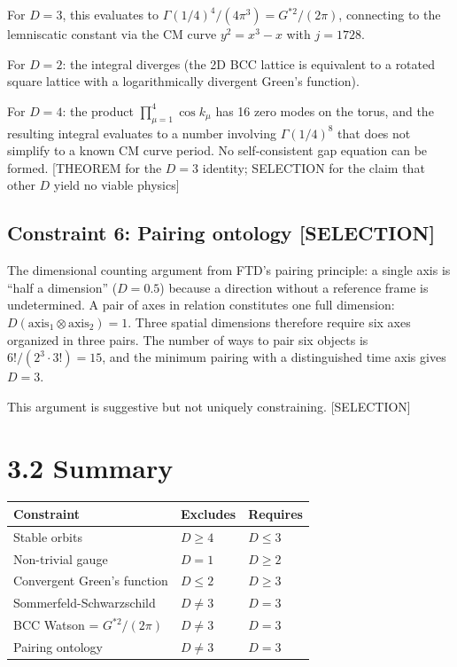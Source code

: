 \documentclass[
  11pt,
  letterpaper,
  twoside,
  openright]{book}
\begin{document}
For \(D = 3\), this evaluates to
\(\Gamma(1/4)^4 / (4\pi^3) = G^{*2}/(2\pi)\), connecting to the
lemniscatic constant via the CM curve \(y^2 = x^3 - x\) with
\(j = 1728\).

For \(D = 2\): the integral diverges (the 2D BCC lattice is equivalent
to a rotated square lattice with a logarithmically divergent Green's
function).

For \(D = 4\): the product \(\prod_{\mu=1}^4 \cos k_\mu\) has 16 zero
modes on the torus, and the resulting integral evaluates to a number
involving \(\Gamma(1/4)^8\) that does not simplify to a known CM curve
period. No self-consistent gap equation can be formed. {[}THEOREM for
the \(D = 3\) identity; SELECTION for the claim that other \(D\) yield
no viable physics{]}

\subsection{Constraint 6: Pairing ontology
{[}SELECTION{]}}\label{constraint-6-pairing-ontology-selection}

The dimensional counting argument from FTD's pairing principle: a single
axis is ``half a dimension'' (\(D = 0.5\)) because a direction without a
reference frame is undetermined. A pair of axes in relation constitutes
one full dimension: \(D(\text{axis}_1 \otimes \text{axis}_2) = 1\).
Three spatial dimensions therefore require six axes organized in three
pairs. The number of ways to pair six objects is
\(6!/(2^3 \cdot 3!) = 15\), and the minimum pairing with a distinguished
time axis gives \(D = 3\).

This argument is suggestive but not uniquely constraining.
{[}SELECTION{]}

\section{3.2 Summary}\label{summary}

\begin{longtable}[]{@{}lll@{}}
\toprule\noalign{}
Constraint & Excludes & Requires \\
\midrule\noalign{}
\endhead
\bottomrule\noalign{}
\endlastfoot
Stable orbits & \(D \geq 4\) & \(D \leq 3\) \\
Non-trivial gauge & \(D = 1\) & \(D \geq 2\) \\
Convergent Green's function & \(D \leq 2\) & \(D \geq 3\) \\
Sommerfeld-Schwarzschild & \(D \neq 3\) & \(D = 3\) \\
BCC Watson = \(G^{*2}/(2\pi)\) & \(D \neq 3\) & \(D = 3\) \\
Pairing ontology & \(D \neq 3\) & \(D = 3\) \\
\end{longtable}
\end{document}
